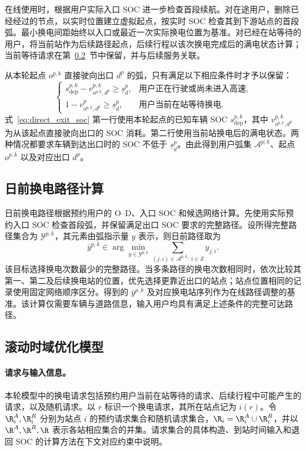 在线使用时，根据用户实际入口 SOC 进一步检查首段续航。对在途用户，删除已经经过的节点，以实时位置建立虚拟起点，按实时 SOC 检查其到下游站点的首段弧。最小换电间距始终以入口或最近一次实际换电位置为基准。对已经在站等待的用户，将当前站作为后续路径起点，后续行程以该次换电完成后的满电状态计算；当前等待请求在第~\ref{sec:model}~节中保留，并与后续服务关联。

从本轮起点 $o^{p,k}$ 直接驶向出口 $d^p$ 的弧，只有满足以下相应条件时才予以保留：
\begin{equation}
\begin{cases}
s_{\mathrm{dep}}^{p,k}-v_{o^{p,k},d^p}^{p,k}\ge\underline s_d^p,
&\text{用户正在行驶或尚未进入高速},\\
1-v_{o^{p,k},d^p}^{p}\ge\underline s_d^p,
&\text{用户当前在站等待换电}.
\end{cases}
\label{eq:direct_exit_soc}
\end{equation}
式~\eqref{eq:direct_exit_soc} 第一行使用本轮起点的已知车辆 SOC $s_{\mathrm{dep}}^{p,k}$，其中 $v_{o^{p,k},d^p}^{p,k}$ 为从该起点直接驶向出口的 SOC 消耗。第二行使用当前站换电后的满电状态。两种情况都要求车辆到达出口时的 SOC 不低于 $\underline s_d^p$。由此得到用户弧集 $\mathcal A^{p,k}$、起点 $o^{p,k}$ 以及对应出口 $d^p$。

\subsection{日前换电路径计算}
\label{sec:dayahead}
日前换电路径根据预约用户的 O--D、入口 SOC 和候选网络计算。先使用实际预约入口 SOC 检查首段弧，并保留满足出口 SOC 要求的完整路径。设所得完整路径集合为 $\mathcal Y^{p,k}$，其元素由弧指示量 $y$ 表示，则日前路径取为
\begin{equation}
\bar y^{p,k}\in\arg\min_{y\in\mathcal Y^{p,k}}
\sum_{(j,i)\in\mathcal A^{p,k}:\,i\in\mathcal S}y_{j,i}.
\label{eq:dayahead_path}
\end{equation}
该目标选择换电次数最少的完整路径。当多条路径的换电次数相同时，依次比较其第一、第二及后续换电站的位置，优先选择更靠近出口的站点；站点位置相同的记录使用固定网络顺序区分。得到的 $\bar y^{p,k}$ 及对应换电站序列作为在线路径调整的基准。该计算仅需要车辆与道路信息，输入用户均具有满足上述条件的完整可达路径。

\subsection{滚动时域优化模型}
\label{sec:model}

\paragraph{请求与输入信息。}
本轮模型中的换电请求包括预约用户当前在站等待的请求、后续行程中可能产生的请求，以及随机请求。以 $r$ 标识一个换电请求，其所在站点记为 $i(r)$。令 $\R_i^A,\R_i^R$ 分别为站点 $i$ 的预约请求集合和随机请求集合，$\R_i=\R_i^A\cup\R_i^R$，并以 $\R^A,\R^R,\R$ 表示各站相应集合的并集。请求集合的具体构造、到站时间输入和退回 SOC 的计算方法在下文对应约束中说明。

